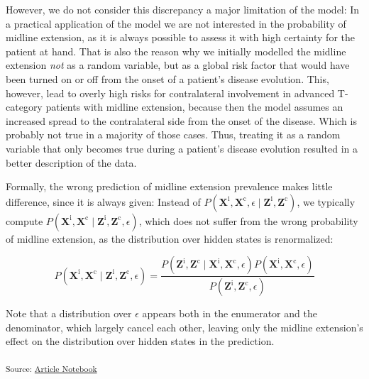 \documentclass[
  sn-mathphys-num,
]{sn-jnl}
\begin{document}
However, we do not consider this discrepancy a major limitation of the
model: In a practical application of the model we are not interested in
the probability of midline extension, as it is always possible to assess
it with high certainty for the patient at hand. That is also the reason
why we initially modelled the midline extension \emph{not} as a random
variable, but as a global risk factor that would have been turned on or
off from the onset of a patient's disease evolution. This, however, lead
to overly high risks for contralateral involvement in advanced
T-category patients with midline extension, because then the model
assumes an increased spread to the contralateral side from the onset of
the disease. Which is probably not true in a majority of those cases.
Thus, treating it as a random variable that only becomes true during a
patient's disease evolution resulted in a better description of the
data.

Formally, the wrong prediction of midline extension prevalence makes
little difference, since it is always given: Instead of
\(P\left( \mathbf{X}^\text{i}, \mathbf{X}^\text{c}, \epsilon \mid \mathbf{Z}^\text{i}, \mathbf{Z}^\text{c} \right)\),
we typically compute
\(P\left( \mathbf{X}^\text{i}, \mathbf{X}^\text{c} \mid \mathbf{Z}^\text{i}, \mathbf{Z}^\text{c}, \epsilon \right)\),
which does not suffer from the wrong probability of midline extension,
as the distribution over hidden states is renormalized:

\[
P \left( \mathbf{X}^\text{i}, \mathbf{X}^\text{c} \mid \mathbf{Z}^\text{i}, \mathbf{Z}^\text{c}, \epsilon \right) = \frac{P \left( \mathbf{Z}^\text{i}, \mathbf{Z}^\text{c} \mid \mathbf{X}^\text{i}, \mathbf{X}^\text{c}, \epsilon \right) P \left( \mathbf{X}^\text{i}, \mathbf{X}^\text{c}, \epsilon \right)}{P \left( \mathbf{Z}^\text{i}, \mathbf{Z}^\text{c}, \epsilon \right)}
\]

Note that a distribution over \(\epsilon\) appears both in the
enumerator and the denominator, which largely cancel each other, leaving
only the midline extension's effect on the distribution over hidden
states in the prediction.

\textsubscript{Source:
\href{https://rmnldwg.github.io/bilateral-paper/manuscript.qmd.html}{Article
Notebook}}


  
\end{document}
